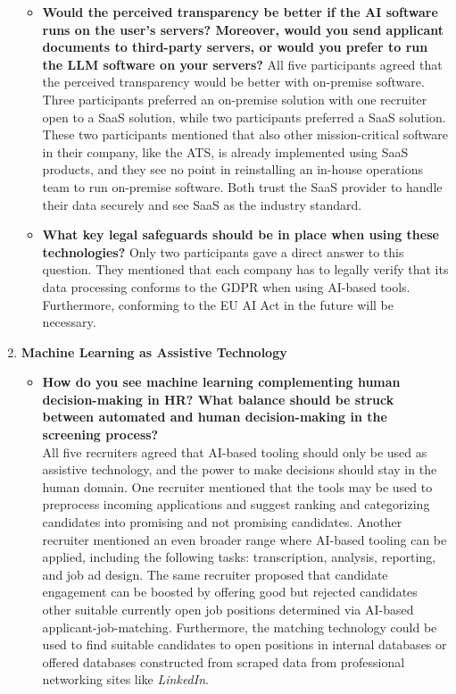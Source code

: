 \documentclass[draft,final]{thesisclass} %
\begin{document}
\begin{enumerate}
\begin{itemize}
        \item \textbf{Would the perceived transparency be better if the \acs{AI} software runs on the user's servers? Moreover, would you send applicant documents to third-party servers, or would you prefer to run the \gls{LLM} software on your servers?}
        All five participants agreed that the perceived transparency would be better with on-premise software.
        Three participants preferred an on-premise solution with one recruiter open to a \acs{SaaS} solution, while two participants preferred a \acs{SaaS} solution.
        These two participants mentioned that also other mission-critical software in their company, like the \acs{ATS}, is already implemented using \acs{SaaS} products, and they see no point in reinstalling an in-house operations team to run on-premise software.
        Both trust the \acs{SaaS} provider to handle their data securely and see \acs{SaaS} as the industry standard.
        \item \textbf{What key legal safeguards should be in place when using these technologies?}
        Only two participants gave a direct answer to this question. They mentioned that each company has to legally verify that its data processing conforms to the \acs{GDPR} when using \acs{AI}-based tools. Furthermore, conforming to the \acs{EU AI Act} in the future will be necessary.
    \end{itemize}
    \item \textbf{Machine Learning as Assistive Technology}
    \begin{itemize}
        \item \textbf{How do you see machine learning complementing human decision-making in \acs{HR}? What balance should be struck between automated and human decision-making in the screening process?}\\
        All five recruiters agreed that \acs{AI}-based tooling should only be used as assistive technology, and the power to make decisions should stay in the human domain. One recruiter mentioned that the tools may be used to preprocess incoming applications and suggest ranking and categorizing candidates into promising and not promising candidates. Another recruiter mentioned an even broader range where \acs{AI}-based tooling can be applied, including the following tasks: transcription, analysis, reporting, and job ad design. The same recruiter proposed that candidate engagement can be boosted by offering good but rejected candidates other suitable currently open job positions determined via \acs{AI}-based applicant-job-matching. Furthermore, the matching technology could be used to find suitable candidates to open positions in internal databases or offered databases constructed from scraped data from professional networking sites like \textit{LinkedIn}.

\end{itemize}
\end{enumerate}
\end{document}
